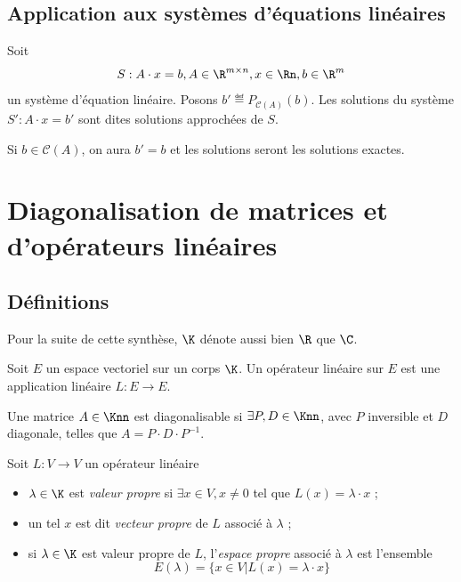 \subsection{Application aux systèmes d'équations linéaires}
Soit
\[ S : A \cdot x = b, A \in \R^{m \times n}, x \in \Rn, b \in \R^m \]
un système d'équation linéaire.
Posons $b' \eqdef P_{\mathcal{C}(A)}(b)$.
Les solutions du système $S' : A \cdot x = b'$ sont dites solutions approchées de $S$.

Si $b \in \mathcal{C}(A)$, on aura $b' = b$ et les solutions seront les solutions exactes.


\section{Diagonalisation de matrices et d'opérateurs linéaires}

\subsection{Définitions}

\begin{mynota}
	Pour la suite de cette synthèse, $\K$ dénote aussi bien $\R$ que $\C$.
\end{mynota}

\begin{mydef}
	Soit $E$ un espace vectoriel sur un corps $\K$.
	Un opérateur linéaire sur $E$ est une application linéaire $L: E \to E$.
\end{mydef}

\begin{mydef}
	Une matrice $A \in \Knn$ est diagonalisable si $\exists P, D \in \Knn$, avec $P$ inversible et $D$ diagonale, telles que $A = P \cdot D \cdot P^{-1}$.
\end{mydef}

\begin{mydef} Soit $L : V \rightarrow V$ un opérateur linéaire
	\begin{itemize}
		\item $\lambda \in \K$ est \emph{valeur propre} si $\exists x \in V, x \neq 0$ tel que $L(x) = \lambda \cdot x$ ;
		\item un tel $x$ est dit \emph{vecteur propre} de $L$ associé à $\lambda$ ;
		\item si $\lambda \in \K$ est valeur propre de $L$, l'\emph{espace propre} associé à $\lambda$ est l'ensemble
			\[ E(\lambda) = \{ x \in V | L(x) = \lambda \cdot x \} \]
	\end{itemize}
\end{mydef}

